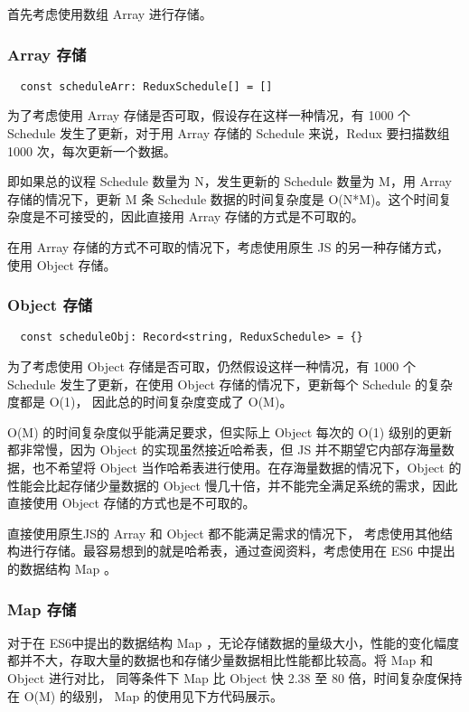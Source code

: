 首先考虑使用数组 Array 进行存储。

\subsubsection{Array 存储}

{\setmainfont{Courier New Bold}
\begin{lstlisting}
  const scheduleArr: ReduxSchedule[] = []
 \end{lstlisting}}
为了考虑使用 Array 存储是否可取，假设存在这样一种情况，有 1000 个 Schedule 发生了更新，对于用 Array 存储的 Schedule 来说，Redux 要扫描数组 1000 次，每次更新一个数据。

即如果总的议程 Schedule 数量为 N，发生更新的 Schedule 数量为 M，用 Array 存储的情况下，更新 M 条 Schedule 数据的时间复杂度是 O(N*M)。这个时间复杂度是不可接受的，因此直接用 Array 存储的方式是不可取的。

在用 Array 存储的方式不可取的情况下，考虑使用原生 JS 的另一种存储方式， 使用 Object 存储。

\subsubsection{Object 存储}

{\setmainfont{Courier New Bold}
\begin{lstlisting}
  const scheduleObj: Record<string, ReduxSchedule> = {}
 \end{lstlisting}}
为了考虑使用 Object 存储是否可取，仍然假设这样一种情况，有 1000 个 Schedule 发生了更新，在使用 Object 存储的情况下，更新每个 Schedule 的复杂度都是 O(1)， 因此总的时间复杂度变成了 O(M)。

O(M) 的时间复杂度似乎能满足要求，但实际上 Object 每次的 O(1) 级别的更新都非常慢，因为 Object 的实现虽然接近哈希表，但 JS 并不期望它内部存海量数据，也不希望将 Object 当作哈希表进行使用。在存海量数据的情况下，Object 的性能会比起存储少量数据的 Object 慢几十倍，并不能完全满足系统的需求，因此直接使用 Object 存储的方式也是不可取的。


直接使用原生JS的 Array 和 Object 都不能满足需求的情况下， 考虑使用其他结构进行存储。最容易想到的就是哈希表，通过查阅资料，考虑使用在 ES6 中提出的数据结构 Map 。

\subsubsection{Map 存储}

对于在 ES6中提出的数据结构 Map ，无论存储数据的量级大小，性能的变化幅度都并不大，存取大量的数据也和存储少量数据相比性能都比较高。将 Map 和 Object 进行对比， 同等条件下 Map 比 Object 快 2.38 至 80 倍，时间复杂度保持在 O(M) 的级别， Map 的使用见下方代码展示。

